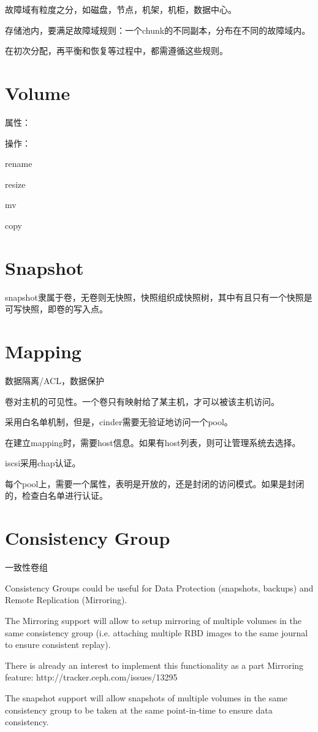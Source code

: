 故障域有粒度之分，如磁盘，节点，机架，机柜，数据中心。

存储池内，要满足故障域规则：一个chunk的不同副本，分布在不同的故障域内。\label{rule:faultset}

在初次分配，再平衡和恢复等过程中，都需遵循这些规则。

\section{Volume}

属性：

操作：
\begin{compactenum}
    \item rename
    \item resize 
    \item mv
    \item copy   %
\end{compactenum}

\section{Snapshot}

snapshot隶属于卷，无卷则无快照，快照组织成快照树，其中有且只有一个快照是可写快照，即卷的写入点。

\section{Mapping}

数据隔离/ACL，数据保护

卷对主机的可见性。一个卷只有映射给了某主机，才可以被该主机访问。

采用白名单机制，但是，cinder需要无验证地访问一个pool。

在建立mapping时，需要host信息。如果有host列表，则可让管理系统去选择。

iscsi采用chap认证。

每个pool上，需要一个属性，表明是开放的，还是封闭的访问模式。如果是封闭的，检查白名单进行认证。


\section{Consistency Group}

一致性卷组

\begin{shadequote}
Consistency Groups could be useful for Data Protection (snapshots, backups) and
Remote Replication (Mirroring).

The Mirroring support will allow to setup mirroring of multiple volumes in the
same consistency group (i.e. attaching multiple RBD images to the same journal
to ensure consistent replay).

There is already an interest to implement this functionality as a part Mirroring feature:
http://tracker.ceph.com/issues/13295

The snapshot support will allow snapshots of multiple volumes in the same
consistency group to be taken at the same point-in-time to ensure data
consistency.
\end{shadequote}
